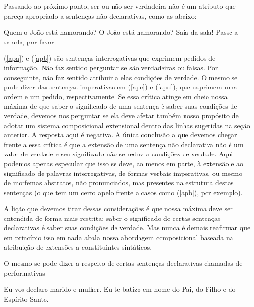 Passando ao próximo ponto, ser ou não ser verdadeira não é um atributo que
pareça apropriado a sen\-ten\-ças não declarativas, como as
abaixo:


\begin{exe}
    \ex\label{ap}
    \begin{xlist}
        \ex  Quem o João está namorando?\label{apa}
        \ex  O João está namorando?\label{apb}
        \ex  Saia da sala!\label{apc}
        \ex  Passe a salada, por favor. \label{apd}
    \end{xlist}
\end{exe}

\n (\ref{apa}) e (\ref{apb}) são sen\-ten\-ças interrogativas que
exprimem pedidos de informa\-ção. Não faz sentido perguntar se são
verdadeiras ou falsas. Por conseguinte, não faz sentido atribuir a
elas condi\-çõ\-es de verdade. O mesmo se pode dizer das
sen\-ten\-ças imperativas em (\ref{apc}) e (\ref{apd}), que
exprimem uma ordem e um pedido, respectivamente. Se essa crítica
atinge em cheio nossa máxima de que saber o significado de uma
sentença é saber suas condi\-çõ\-es de verdade, devemos nos
perguntar se ela deve afetar também nosso propósito de adotar um
sistema composicional extensional dentro das linhas sugeridas na
se\-ção anterior. A resposta aqui é negativa. A única conclusão a
que devemos chegar frente a essa crítica é que a extensão de uma
sentença não declarativa não é um valor de verdade e seu significado não se reduz a condições de verdade. Aqui podemos apenas
especular que isso se deve, ao menos em parte, à extensão e ao significado de
palavras interrogativas, de formas verbais imperativas, ou mesmo
de morfemas abstratos, não pronunciados, mas presentes na estrutura destas
sen\-ten\-ças (o que tem um certo apelo frente a casos como
(\ref{apb}), por exemplo).

A li\-ção que devemos tirar dessas considera\-çõ\-es é que nossa
máxima deve ser entendida de forma mais restrita: saber o
significado de certas sen\-ten\-ças declarativas é saber suas
condi\-çõ\-es de verdade. Mas nunca é demais reafirmar que em
prin\-cí\-pio isso em nada abala nossa abordagem composicional
baseada na atribui\-ção de extensões a constituintes sintáticos.

O mesmo se pode dizer a respeito de certas sen\-ten\-ças
declarativas chamadas de performativas:


\begin{exe}
    \ex\label{per}
    \begin{xlist}
        \ex  Eu vos declaro marido e mulher.\label{pera}
        \ex  Eu te batizo em nome do Pai, do Filho e do Espírito Santo.\label{perb}
    \end{xlist}
\end{exe}


